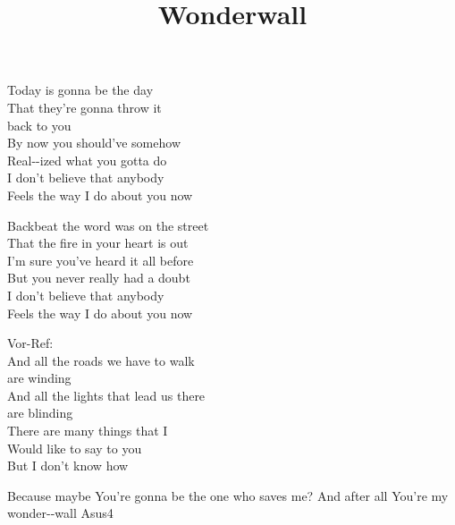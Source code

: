 \title{Wonderwall} 

\begin{enumerate}
       

\verse {} Today is  gonna be the day \\ 
That they’re  gonna throw it \\ 
back to  you \\ 
 By now you  should’ve somehow \\ 
Real--ized what you gotta  do \\ 
 I don’t believe that  anybody \\ 
 Feels the way I  do about you  now  

\verse {} Backbeat the  word was on the street \\ 
That the  fire in your heart is  out \\ 
 I’m sure you’ve  heard it all before \\ 
But you  never really had a  doubt \\ 
 I don’t believe that  anybody \\ 
 Feels the way I  do about you  now  

Vor-Ref: \\ 
And  all the roads we  have to walk \\ 
are  winding \\ 
And  all the lights that  lead us there \\ 
are  blinding \\ 
 There are many  things that I \\ 
Would  like to  say to  you \\ 
But I  don’t know  how

 Because  maybe  
 You’re gonna be the one who  saves me?  
And  after  all 
 You’re my  wonder--wall    Asus4


\end{enumerate}
